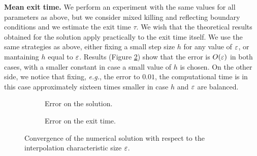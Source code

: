 \vspace{2mm}
\noindent \textbf{Mean exit time.} We perform an experiment with the same values for all parameters as above, but we consider mixed killing and reflecting boundary conditions and we estimate the exit time $\tau$. We wish that the theoretical results obtained for the solution apply practically to the exit time itself. We use the same strategies as above, either fixing a small step size $h$ for any value of $\varepsilon$, or mantaining $h$ equal to $\varepsilon$. Results (Figure \ref{fig:TheoryTau}) show that the error is $O(\varepsilon)$ in both cases, with a smaller constant in case a small value of $h$ is chosen. On the other side, we notice that fixing, \textit{e.g.}, the error to $0.01$, the computational time is in this case approximately sixteen times smaller in case $h$ and $\varepsilon$ are balanced.

\begin{figure}[t]
    \centering
    \begin{subfigure}{0.49\linewidth}
        \centering
        \resizebox{1\linewidth}{!}{ }   
        \caption{Error on the solution.}
        \label{fig:TheoryX}
    \end{subfigure}
    \begin{subfigure}{0.49\linewidth}
        \centering
        \resizebox{1\linewidth}{!}{ }  
        \caption{Error on the exit time.}
        \label{fig:TheoryTau}
    \end{subfigure}    
    \caption{Convergence of the numerical solution with respect to the interpolation characteristic size $\varepsilon$.}
    \label{fig:Theory}
\end{figure}
